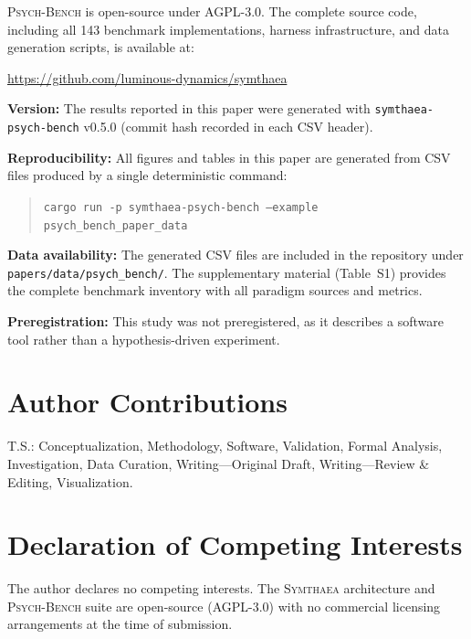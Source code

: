 \documentclass[11pt,letterpaper]{article}
\newcommand{\symthaea}{\textsc{Symthaea}}
\newcommand{\psychbench}{\textsc{Psych-Bench}}
\begin{document}
\psychbench{} is open-source under AGPL-3.0. The complete source code, including all 143 benchmark implementations, harness infrastructure, and data generation scripts, is available at:

\begin{center}
\url{https://github.com/luminous-dynamics/symthaea}
\end{center}

\noindent\textbf{Version:} The results reported in this paper were generated with \texttt{symthaea-psych-bench} v0.5.0 (commit hash recorded in each CSV header).

\noindent\textbf{Reproducibility:} All figures and tables in this paper are generated from CSV files produced by a single deterministic command:
\begin{quote}
\texttt{cargo run -p symthaea-psych-bench --example psych\_bench\_paper\_data}
\end{quote}

\noindent\textbf{Data availability:} The generated CSV files are included in the repository under \texttt{papers/\allowbreak{}data/\allowbreak{}psych\_bench/}. The supplementary material (Table~S1) provides the complete benchmark inventory with all paradigm sources and metrics.

\noindent\textbf{Preregistration:} This study was not preregistered, as it describes a software tool rather than a hypothesis-driven experiment.

\section*{Author Contributions}

\noindent T.S.: Conceptualization, Methodology, Software, Validation, Formal Analysis, Investigation, Data Curation, Writing---Original Draft, Writing---Review \& Editing, Visualization.

\section*{Declaration of Competing Interests}

\noindent The author declares no competing interests. The \symthaea{} architecture and \psychbench{} suite are open-source (AGPL-3.0) with no commercial licensing arrangements at the time of submission.



\end{document}
